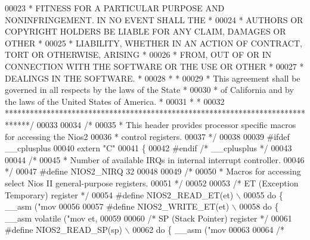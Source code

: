 \begin{DoxyCode}
00023 \textcolor{comment}{* FITNESS FOR A PARTICULAR PURPOSE AND NONINFRINGEMENT. IN NO EVENT SHALL THE *}
00024 \textcolor{comment}{* AUTHORS OR COPYRIGHT HOLDERS BE LIABLE FOR ANY CLAIM, DAMAGES OR OTHER      *}
00025 \textcolor{comment}{* LIABILITY, WHETHER IN AN ACTION OF CONTRACT, TORT OR OTHERWISE, ARISING     *}
00026 \textcolor{comment}{* FROM, OUT OF OR IN CONNECTION WITH THE SOFTWARE OR THE USE OR OTHER         *}
00027 \textcolor{comment}{* DEALINGS IN THE SOFTWARE.                                                   *}
00028 \textcolor{comment}{*                                                                             *}
00029 \textcolor{comment}{* This agreement shall be governed in all respects by the laws of the State   *}
00030 \textcolor{comment}{* of California and by the laws of the United States of America.              *}
00031 \textcolor{comment}{*                                                                             *}
00032 \textcolor{comment}{******************************************************************************/}
00033 
00034 \textcolor{comment}{/*}
00035 \textcolor{comment}{ * This header provides processor specific macros for accessing the Nios2}
00036 \textcolor{comment}{ * control registers.}
00037 \textcolor{comment}{ */}
00038 
00039 \textcolor{preprocessor}{#ifdef \_\_cplusplus}
00040 \textcolor{keyword}{extern} \textcolor{stringliteral}{"C"}
00041 \{
00042 \textcolor{preprocessor}{#endif }\textcolor{comment}{/* \_\_cplusplus */}\textcolor{preprocessor}{}
00043 
00044 \textcolor{comment}{/*}
00045 \textcolor{comment}{ * Number of available IRQs in internal interrupt controller.}
00046 \textcolor{comment}{ */}
00047 \textcolor{preprocessor}{#define NIOS2\_NIRQ 32}
00048 
00049 \textcolor{comment}{/*}
00050 \textcolor{comment}{ * Macros for accessing select Nios II general-purpose registers.}
00051 \textcolor{comment}{ */}
00052 
00053 \textcolor{comment}{/* ET (Exception Temporary) register */} 
00054 \textcolor{preprocessor}{#define NIOS2\_READ\_ET(et) \(\backslash\)}
00055 \textcolor{preprocessor}{    do \{ \_\_asm ("mov %
00056 
00057 \textcolor{preprocessor}{#define NIOS2\_WRITE\_ET(et) \(\backslash\)}
00058 \textcolor{preprocessor}{    do \{ \_\_asm volatile ("mov et, %
00059 
00060 \textcolor{comment}{/* SP (Stack Pointer) register */} 
00061 \textcolor{preprocessor}{#define NIOS2\_READ\_SP(sp) \(\backslash\)}
00062 \textcolor{preprocessor}{    do \{ \_\_asm ("mov %
00063 
00064 \textcolor{comment}{/*}
}}}
\end{DoxyCode}
